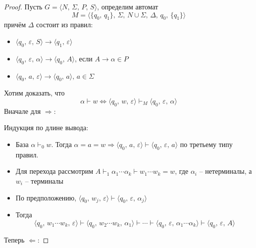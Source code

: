 \documentclass[a4paper,12pt]{article}
\theoremstyle{plain}
\theoremstyle{definition}
\theoremstyle{remark}
\begin{document}
\begin{proof}
	Пусть $G = \langle N,\, \Sigma,\, P,\, S\rangle$, определим автомат
	\[
		M = \langle \{q_0,\, q_1\},\, \Sigma,\, N \cup \Sigma,\, \Delta,\, q_0,\, \{q_1\}\rangle
	\]
	причём $\Delta$ состоит из правил:
	\begin{itemize}
		\item $\langle q_0,\, \varepsilon,\, S\rangle \to \langle q_1,\, \varepsilon\rangle$
		\item $\langle q_0,\, \varepsilon,\, \alpha\rangle \to\langle q_0,\, A\rangle$, если $A \to \alpha \in P$
		\item $\langle q_0,\, a,\, \varepsilon\rangle \to \langle q_0,\, a\rangle,\, a \in \Sigma$
	\end{itemize}
	Хотим доказать, что
	\[
		\alpha \vdash w \Leftrightarrow \langle q_0,\, w,\, \varepsilon\rangle \vdash_M \langle q_0,\, \varepsilon,\, \alpha\rangle
	\]
	Вначале для $\Rightarrow$:

	Индукция по длине вывода:
	\begin{itemize}
		\item База $\alpha \vdash_0 w$. Тогда $\alpha = a = w \Rightarrow \langle q_0,\, a,\, \varepsilon\rangle \vdash \langle q_0,\, \varepsilon,\, a\rangle$ по третьему типу правил.
		\item Для перехода рассмотрим $A \vdash_1 \alpha_1\cdots\alpha_k \vdash w_1\cdots w_k = w$, где $\alpha_i$ -- нетерминалы, а $w_i$ -- терминалы
		\item По предположению, $\langle q_0,\, w_j,\, \varepsilon\rangle \vdash \langle q_0,\, \varepsilon,\, \alpha_j\rangle$
		\item Тогда
		      \[
			      \langle q_0,\, w_1\cdots w_k,\, \varepsilon\rangle \vdash \langle q_0,\, w_2\cdots w_k,\, \alpha_1\rangle\vdash\cdots\vdash\langle q_0,\, \varepsilon,\, \alpha_1\cdots\alpha_k\rangle \vdash\langle q_0,\, \varepsilon,\, A\rangle
		      \]
	\end{itemize}
	Теперь $\Leftarrow$:


\end{proof}
\end{document}
